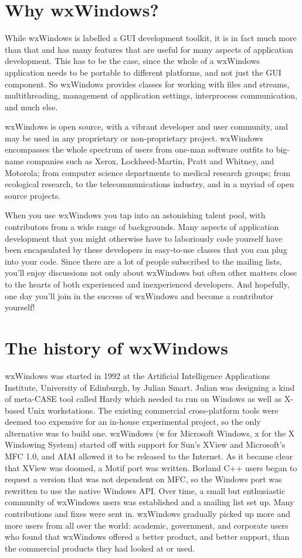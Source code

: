\section{Why wxWindows?}

While wxWindows is labelled a GUI development toolkit, it is in
fact much more than that and has many features that are useful
for many aspects of application development. This has to
be the case, since the whole of a wxWindows application needs to
be portable to different platforms, and not just the GUI
component. So wxWindows provides classes for working with files
and streams, multithreading, management of application settings,
interprocess communication, and much else.

wxWindows is open source, with a vibrant developer and user
community, and may be used in any proprietary or non-proprietary
project. wxWindows encompasses the whole spectrum of users from
one-man software outfits to big-name companies such as Xerox,
Lockheed-Martin, Pratt and Whitney, and Motorola; from computer
science departments to medical research groups; from ecological
research, to the telecommunications industry, and in a myriad of
open source projects.

When you use wxWindows you tap into an astonishing talent pool,
with contributors from a wide range of backgrounds. Many aspects
of application development that you might otherwise have to
laboriously code yourself have been encapsulated by these
developers in easy-to-use classes that you can plug into your
code. Since there are a lot of people subscribed to the mailing
lists, you'll enjoy discussions not only about wxWindows but
often other matters close to the hearts of both experienced and
inexperienced developers. And hopefully, one day you'll join in the
success of wxWindows and become a contributor yourself!

\section{The history of wxWindows}

wxWindows was started in 1992 at the Artificial Intelligence
Applications Institute, University of Edinburgh, by Julian
Smart. Julian was designing a kind of meta-CASE tool called
Hardy which needed to run on Windows as well as X-based Unix
workstations. The existing commercial cross-platform tools were
deemed too expensive for an in-house experimental project, so
the only alternative was to build one. wxWindows (w for Microsoft
Windows, x for the X Windowing System) started off with support for Sun's XView
and Microsoft's MFC 1.0, and
AIAI allowed it to be released to the Internet. As it became
clear that XView was doomed, a Motif port was written. Borland
C++ users began to request a version that was not dependent on
MFC, so the Windows port was rewritten to use the native Windows
API. Over time, a small but enthusiastic community of wxWindows
users was established and a mailing list set up. Many contributions
and fixes were sent in. wxWindows gradually picked up more and more users
from all over the world: academic, government, and corporate users
who found that wxWindows offered a better product, and better support, than the
commercial products they had looked at or used.

